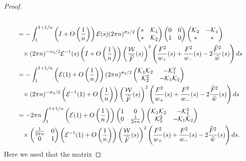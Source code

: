 \documentclass[11pt]{article}
\numberwithin{equation}{section}
\newcommand{\Id}{I}
\newcommand{\cK}{\mathcal{K}}
\newcommand{\cE}{\mathcal{E}}
\newcommand{\cW}{\mathcal{W}}
\newcommand{\hw}{\widehat w}
\newcommand{\hF}{\widehat F}
\newcommand{\hFw}{\frac{\hF^2}{\hw}}
\numberwithin{equation}{section}
\begin{document}
\begin{proof}
\begin{align}
 \\ &\qquad= - \int_1^{1+1/n} \left( \Id + O\left(\frac{1}{n}\right)\right)\cE(s)(2\pi n)^{\sigma_3/2}
 \begin{pmatrix}
 * & \cK_1
 \\
 * & \cK_2
 \end{pmatrix}
 \begin{pmatrix}
 0 & 0
 \\
 1 & 0
 \end{pmatrix} \begin{pmatrix}
 \cK_2 & -\cK_1
 \\
 * & *
 \end{pmatrix}\nonumber
 \\
 &\phantom{\qquad=}{}\times (2\pi n)^{-\sigma_3/2}\cE^{-1}(s) \left( \Id + O\left(\frac{1}{n}\right)\right) \left(\frac{\cW}{\hF}(s)\right)^2\left(\frac{F^2}{w_+}(s)+\frac{F^2}{w_-}(s)-2\hFw(s)\right) {\rm d}s\nonumber
 \\
 &\qquad= -\int_1^{1+1/n} \left( \cE(1) + O\left( \frac{1}{n} \right)\right)(2\pi n)^{\sigma_3/2}
 \begin{pmatrix}
 \cK_1\cK_2 & -\cK^2_1
 \\
 \cK^2_2 & -\cK_1\cK_2
 \end{pmatrix}\nonumber
 \\
 &\phantom{\qquad=}{}\times (2\pi n)^{-\sigma_3/2} \left( \cE^{-1}(1) + O\left( \frac{1}{n} \right)\right)\left(\frac{\cW}{\hF}(s)\right)^2\left(\frac{F^2}{w_+}(s)+\frac{F^2}{w_-}(s)-2\hFw(s)\right) {\rm d}s\nonumber
 \\
 &\qquad=- 2\pi n \int_1^{1+1/n} \left( \cE(1) + O\left( \frac{1}{n} \right)\right)
 \begin{pmatrix}
 1 & 0
 \\
 0 & \frac{1}{2\pi n}
 \end{pmatrix}
 \begin{pmatrix}
 \cK_1\cK_2 & -\cK^2_1
 \\
 \cK^2_2 & -\cK_1\cK_2
 \end{pmatrix} \label{veryLongEq}\\
 &\phantom{\qquad=}{}\times
 \begin{pmatrix}
 \frac{1}{2\pi n} & 0
 \\
 0 & 1
 \end{pmatrix}\left( \cE^{-1}(1) + O\left( \frac{1}{n} \right)\right)\left(\frac{\cW}{\hF}(s)\right)^2\left(\frac{F^2}{w_+}(s)+\frac{F^2}{w_-}(s)-2\hFw(s)\right) {\rm d}s.\nonumber
\end{align}
Here we used that the matrix \smash{$\left(\begin{smallmatrix}

\end{smallmatrix}}
\end{proof}
\end{document}
